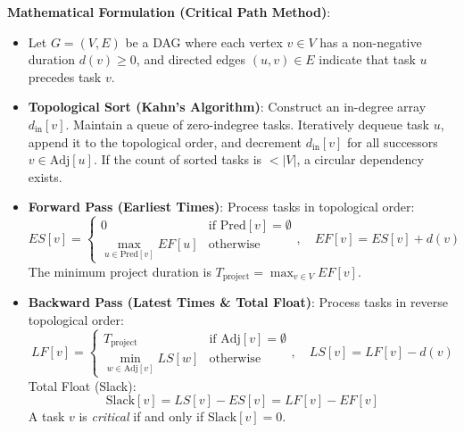 \documentclass[12pt]{article}
\begin{document}
\textbf{Mathematical Formulation (Critical Path Method)}:
\begin{itemize}
    \item Let $G = (V, E)$ be a DAG where each vertex $v \in V$ has a non-negative duration $d(v) \ge 0$, and directed edges $(u, v) \in E$ indicate that task $u$ precedes task $v$.
    \item \textbf{Topological Sort (Kahn's Algorithm)}: Construct an in-degree array $d_{\text{in}}[v]$. Maintain a queue of zero-indegree tasks. Iteratively dequeue task $u$, append it to the topological order, and decrement $d_{\text{in}}[v]$ for all successors $v \in \text{Adj}[u]$. If the count of sorted tasks is $< |V|$, a circular dependency exists.
    \item \textbf{Forward Pass (Earliest Times)}: Process tasks in topological order:
    \[
    ES[v] = \begin{cases} 0 & \text{if } \text{Pred}[v] = \emptyset \\ \max_{u \in \text{Pred}[v]} EF[u] & \text{otherwise} \end{cases}, \quad EF[v] = ES[v] + d(v)
    \]
    The minimum project duration is $T_{\text{project}} = \max_{v \in V} EF[v]$.
    \item \textbf{Backward Pass (Latest Times \& Total Float)}: Process tasks in reverse topological order:
    \[
    LF[v] = \begin{cases} T_{\text{project}} & \text{if } \text{Adj}[v] = \emptyset \\ \min_{w \in \text{Adj}[v]} LS[w] & \text{otherwise} \end{cases}, \quad LS[v] = LF[v] - d(v)
    \]
    Total Float (Slack):
    \[
    \text{Slack}[v] = LS[v] - ES[v] = LF[v] - EF[v]
    \]
    A task $v$ is \textit{critical} if and only if $\text{Slack}[v] = 0$.
\end{itemize}
\end{document}
